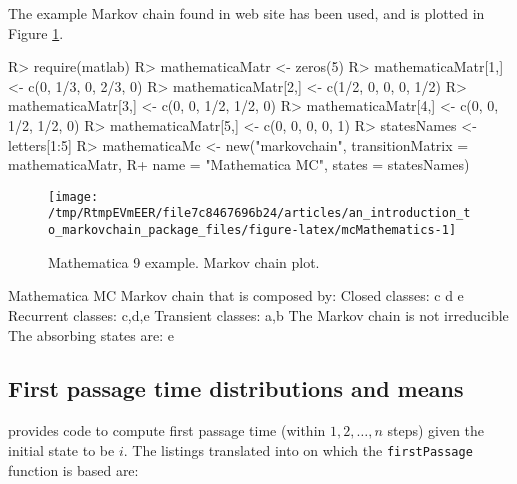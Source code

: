 \documentclass[
  nojss]{jss}
\begin{document}
The example Markov chain found in  web site \citep{mathematica9MarkovChain} has
been used, and is plotted in Figure \ref{fig:mcMathematics}.

\begin{CodeChunk}

\begin{CodeInput}
R> require(matlab)
R> mathematicaMatr <- zeros(5)
R> mathematicaMatr[1,] <- c(0, 1/3, 0, 2/3, 0)
R> mathematicaMatr[2,] <- c(1/2, 0, 0, 0, 1/2)
R> mathematicaMatr[3,] <- c(0, 0, 1/2, 1/2, 0)
R> mathematicaMatr[4,] <- c(0, 0, 1/2, 1/2, 0)
R> mathematicaMatr[5,] <- c(0, 0, 0, 0, 1)
R> statesNames <- letters[1:5]
R> mathematicaMc <- new("markovchain", transitionMatrix = mathematicaMatr,
R+                    name = "Mathematica MC", states = statesNames)
\end{CodeInput}
\end{CodeChunk}

\begin{CodeChunk}
\begin{figure}

{\centering \texttt{[image: /tmp/RtmpEVmEER/file7c8467696b24/articles/an\_introduction\_to\_markovchain\_package\_files/figure-latex/mcMathematics-1]} 

}

\caption[Mathematica 9 example]{Mathematica 9 example. Markov chain plot.}\label{fig:mcMathematics}
\end{figure}
\end{CodeChunk}

\begin{CodeChunk}

\begin{CodeOutput}
Mathematica MC  Markov chain that is composed by: 
Closed classes: 
c d 
e 
Recurrent classes: 
{c,d},{e}
Transient classes: 
{a,b}
The Markov chain is not irreducible 
The absorbing states are: e
\end{CodeOutput}
\end{CodeChunk}

\hypertarget{first-passage-time-distributions-and-means}{%
\subsection{First passage time distributions and means}\label{first-passage-time-distributions-and-means}}

\cite{renaldoMatlab} provides code to compute first passage time (within \(1,2,\ldots, n\) steps) given the initial state to be \(i\). The  listings translated into  on which the \texttt{firstPassage} function is based are:
\end{document}
